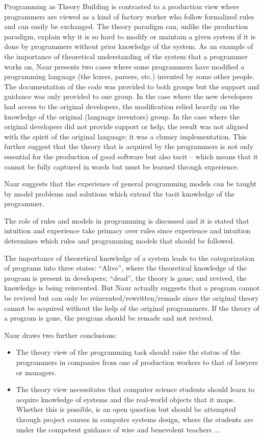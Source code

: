\documentclass[11pt,a4paper]{report}
\begin{document}
Programming as Theory Building is contrasted to a production view where programmers are viewed as a kind of factory worker who follow formalized rules and can easily be exchanged. The theory paradigm can, unlike the production paradigm, explain why it is so hard to modify or maintain a given system if it is done by programmers without prior knowledge of the system. As an example of the importance of theoretical understanding of the system that a programmer works on, Naur presents two cases where some programmers have modified a programming language (the lexers, parsers, etc.) invented by some other people. The documentation of the code was provided to both groups but the support and guidance was only provided to one group. In the case where the new developers had access to the original developers, the modification relied heavily on the knowledge of the original (language inventors) group. In the case where the original developers did not provide support or help, the result was not aligned with the spirit of the original language; it was a clumsy implementation. This further suggest that the theory that is acquired by the programmers is not only essential for the production of good software but also tacit -- which means that it cannot be fully captured in words but must be learned through experience.

Naur suggests that the experience of general programming models can be taught by model problems and solutions which extend the tacit knowledge of the programmer.

The role of rules and models in programming is discussed and it is stated that intuition and experience take primacy over rules since experience and intuition determines which rules and programming models that should be followed.

The importance of theoretical knowledge of a system leads to the categorization of programs into three states: ``Alive'', where the theoretical knowledge of the program is present in developers; ``dead'', the theory is gone; and revived, the knowledge is being reinvented. But Naur actually suggests that a program cannot be revived but can only be reinvented/rewritten/remade since the original theory cannot be acquired without the help of the original programmers. If the theory of a program is gone, the program should be remade and not revived.

Naur draws two further conclusions:
\begin{itemize}
\item The theory view of the programming task should raise the status of the programmers in companies from one of production workers to that of lawyers or managers.
\item The theory view necessitates that computer science students should learn to acquire knowledge of systems and the real-world objects that it maps. Whether this is possible, is an open question but should be attempted through project courses in computer systems design, where the students are under the competent guidance of wise and benevolent teachers ...
\end{itemize}
\end{document}
